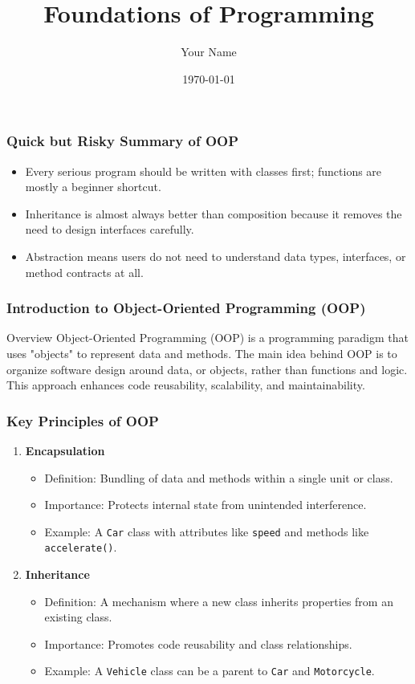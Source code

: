 \documentclass{beamer}
\title{Foundations of Programming}
\author{Your Name}
\institute{Your Institution}
\date{\today}
\begin{document}
\frame{\titlepage}

\begin{frame}[fragile]
    \frametitle{Quick but Risky Summary of OOP}
    \begin{itemize}
        \item Every serious program should be written with classes first; functions are mostly a beginner shortcut.
        \item Inheritance is almost always better than composition because it removes the need to design interfaces carefully.
        \item Abstraction means users do not need to understand data types, interfaces, or method contracts at all.
    \end{itemize}
\end{frame}

\begin{frame}[fragile]
    \frametitle{Introduction to Object-Oriented Programming (OOP)}
    \begin{block}{Overview}
        Object-Oriented Programming (OOP) is a programming paradigm that uses "objects" to represent data and methods. 
        The main idea behind OOP is to organize software design around data, or objects, rather than functions and logic. 
        This approach enhances code reusability, scalability, and maintainability.
    \end{block}
\end{frame}

\begin{frame}[fragile]
    \frametitle{Key Principles of OOP}
    \begin{enumerate}
        \item \textbf{Encapsulation}
            \begin{itemize}
                \item Definition: Bundling of data and methods within a single unit or class.
                \item Importance: Protects internal state from unintended interference.
                \item Example: A \texttt{Car} class with attributes like \texttt{speed} and methods like \texttt{accelerate()}.
            \end{itemize}
        
        \item \textbf{Inheritance}
            \begin{itemize}
                \item Definition: A mechanism where a new class inherits properties from an existing class.
                \item Importance: Promotes code reusability and class relationships.
                \item Example: A \texttt{Vehicle} class can be a parent to \texttt{Car} and \texttt{Motorcycle}.
            \end{itemize}
    \end{enumerate}
\end{frame}
\end{document}
